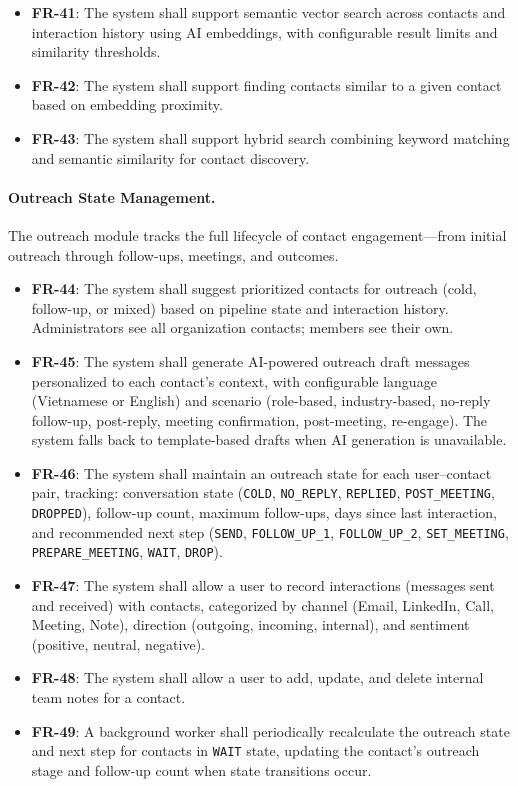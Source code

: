 \begin{itemize}
    \item \textbf{FR-41}: The system shall support semantic vector search across contacts and interaction history using AI embeddings, with configurable result limits and similarity thresholds.
    \item \textbf{FR-42}: The system shall support finding contacts similar to a given contact based on embedding proximity.
    \item \textbf{FR-43}: The system shall support hybrid search combining keyword matching and semantic similarity for contact discovery.
\end{itemize}

\paragraph{Outreach State Management.}
The outreach module tracks the full lifecycle of contact engagement---from initial outreach through follow-ups, meetings, and outcomes.

\begin{itemize}
    \item \textbf{FR-44}: The system shall suggest prioritized contacts for outreach (cold, follow-up, or mixed) based on pipeline state and interaction history. Administrators see all organization contacts; members see their own.
    \item \textbf{FR-45}: The system shall generate AI-powered outreach draft messages personalized to each contact's context, with configurable language (Vietnamese or English) and scenario (role-based, industry-based, no-reply follow-up, post-reply, meeting confirmation, post-meeting, re-engage). The system falls back to template-based drafts when AI generation is unavailable.
    \item \textbf{FR-46}: The system shall maintain an outreach state for each user--contact pair, tracking: conversation state (\texttt{COLD}, \texttt{NO\_REPLY}, \texttt{REPLIED}, \texttt{POST\_MEETING}, \texttt{DROPPED}), follow-up count, maximum follow-ups, days since last interaction, and recommended next step (\texttt{SEND}, \texttt{FOLLOW\_UP\_1}, \texttt{FOLLOW\_UP\_2}, \texttt{SET\_MEETING}, \texttt{PREPARE\_MEETING}, \texttt{WAIT}, \texttt{DROP}).
    \item \textbf{FR-47}: The system shall allow a user to record interactions (messages sent and received) with contacts, categorized by channel (Email, LinkedIn, Call, Meeting, Note), direction (outgoing, incoming, internal), and sentiment (positive, neutral, negative).
    \item \textbf{FR-48}: The system shall allow a user to add, update, and delete internal team notes for a contact.
    \item \textbf{FR-49}: A background worker shall periodically recalculate the outreach state and next step for contacts in \texttt{WAIT} state, updating the contact's outreach stage and follow-up count when state transitions occur.
\end{itemize}

